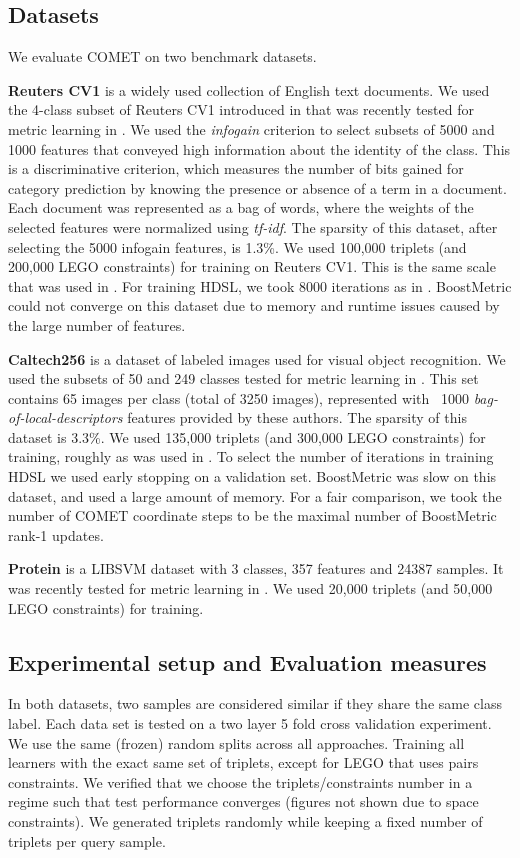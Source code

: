 \documentclass{article} %
\begin{document}
\subsection{Datasets}
We evaluate COMET on two benchmark datasets.

\textbf{Reuters CV1} is a widely used collection of English text documents. We used the 4-class subset of Reuters CV1 introduced in \cite{CaiRCV14} that was recently tested for metric learning in \cite{hdsl}. We used the \textit{infogain} criterion \cite{infogain} to select subsets of 5000 and 1000 features that conveyed high information about the identity of the class. This is a discriminative criterion, which measures the number of bits gained for category prediction by knowing the presence or absence of a term in a document. Each document was represented as a bag of words, where the weights of the selected features were normalized using \textit{tf-idf}. The sparsity of this dataset, after selecting the 5000 infogain features, is 1.3\%. We used 100,000 triplets (and 200,000 LEGO constraints) for training on Reuters CV1. This is the same scale that was used in \cite{hdsl}. For training HDSL, we took 8000 iterations as in \cite{hdsl}. BoostMetric could not converge on this dataset due to memory and runtime issues caused by the large number of features.

\textbf{Caltech256} is a dataset of labeled images used for visual object recognition. We used the subsets of 50 and 249 classes tested for metric learning in \cite{OASIS}. This set contains 65 images per class (total of 3250 images), represented with ~1000 \textit{bag-of-local-descriptors} features provided by these authors. The sparsity of this dataset is 3.3\%. We used 135,000 triplets (and 300,000 LEGO constraints) for training, roughly as was used in \cite{OASIS}. To select the number of iterations in training HDSL we used early stopping on a validation set. BoostMetric was slow on this dataset, and used a large amount of memory. For a fair comparison, we took the number of COMET coordinate steps to be the maximal number of BoostMetric rank-1 updates.

\textbf{Protein} is a LIBSVM \cite{libsvm} dataset with 3 classes, 357 features and 24387 samples. It was recently tested for metric learning in \cite{qian}. We used 20,000 triplets (and 50,000 LEGO constraints) for training.

\subsection{Experimental setup and Evaluation measures}
In both datasets, two samples are considered similar if they share the same class label. Each data set is tested on a two layer 5 fold cross validation experiment. We use the same (frozen) random splits across all approaches. Training all learners with the exact same set of triplets, except for LEGO that uses pairs constraints. We verified that we choose the triplets/constraints number in a regime such that test performance converges (figures not shown due to space constraints). We generated triplets randomly while keeping a fixed number of triplets per query sample.
\end{document}
